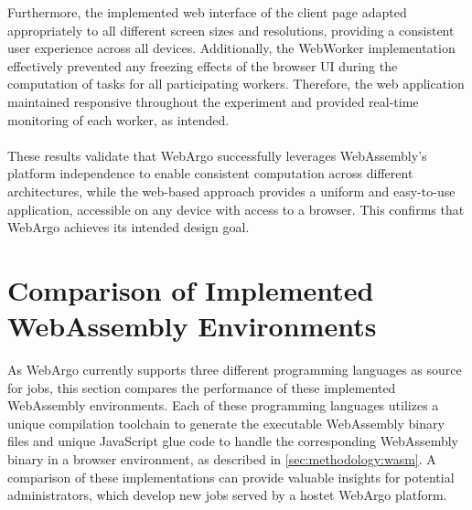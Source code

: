 Furthermore, the implemented web interface of the client page adapted appropriately to all different screen sizes and resolutions, providing a consistent user experience across all devices. Additionally, the WebWorker implementation effectively prevented any freezing effects of the browser \ac{UI} during the computation of tasks for all participating workers. Therefore, the web application maintained responsive throughout the experiment and provided real-time monitoring of each worker, as intended.
\\~\\
These results validate that WebArgo successfully leverages WebAssembly's platform independence to enable consistent computation across different architectures, while the web-based approach provides a uniform and easy-to-use application, accessible on any device with access to a browser. This confirms that WebArgo achieves its intended design goal.

\section{Comparison of Implemented WebAssembly Environments}
\label{sec:evaluation:languages}
As WebArgo currently supports three different programming languages as source for jobs, this section compares the performance of these implemented WebAssembly environments. Each of these programming languages utilizes a unique compilation toolchain to generate the executable WebAssembly binary files and unique JavaScript glue code to handle the corresponding WebAssembly binary in a browser environment, as described in \autoref{sec:methodology:wasm}. A comparison of these implementations can provide valuable insights for potential administrators, which develop new jobs served by a hostet WebArgo platform.

